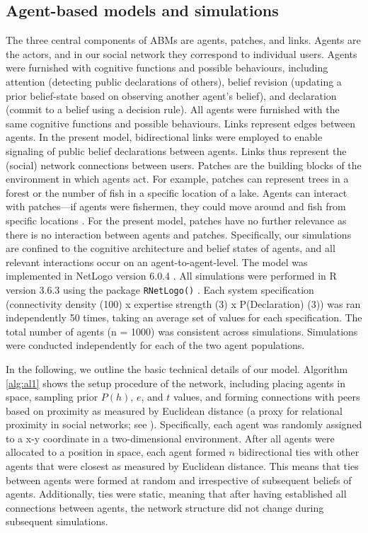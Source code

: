 \documentclass[fleqn,10pt]{wlscirep}
\begin{document}
\subsection*{Agent-based models and simulations}
The three central components of ABMs are agents, patches, and links. Agents are the actors, and in our social network they correspond to individual users. Agents were furnished with cognitive functions and possible behaviours, including attention (detecting public declarations of others), belief revision (updating a prior belief-state based on observing another agent’s belief), and declaration (commit to a belief using a decision rule). All agents were furnished with the same cognitive functions and possible behaviours. Links represent edges between agents. In the present model, bidirectional links were employed to enable signaling of public belief declarations between agents. Links thus represent the (social) network connections between users. Patches are the building blocks of the environment in which agents act. For example, patches can represent trees in a forest or the number of fish in a specific location of a lake. Agents can interact with patches---if agents were fishermen, they could move around and fish from specific locations \cite{bailey2018computational}. For the present model, patches have no further relevance as there is no interaction between agents and patches. Specifically, our simulations are confined to the cognitive architecture and belief states of agents, and all relevant interactions occur on an agent-to-agent-level.
The model was implemented in NetLogo version 6.0.4 \cite{wilensky1999netlogo}. All simulations were performed in R version 3.6.3 \cite{rversion} using the package {\tt RNetLogo()} \cite{thiele2014r}. Each system specification (connectivity density (100) x expertise strength (3) x P(Declaration) (3)) was ran independently 50 times, taking an average set of values for each specification. The total number of agents (n = 1000) was consistent across simulations. Simulations were conducted independently for each of the two agent populations.

In the following, we outline the basic technical details of our model. Algorithm \ref{alg:al1} shows the setup procedure of the network, including placing agents in space, sampling prior \(P(h)\), \(e\), and \(t\) values, and forming connections with peers based on proximity as measured by Euclidean distance (a proxy for relational proximity in social networks; see \cite{duggins2017}). Specifically, each agent was randomly assigned to a x-y coordinate in a two-dimensional environment. After all agents were allocated to a position in space, each agent formed \(n\) bidirectional ties with other agents that were closest as measured by Euclidean distance. This means that ties between agents were formed at random and irrespective of subsequent beliefs of agents. Additionally, ties were static, meaning that after having established all connections between agents, the network structure did not change during subsequent simulations.  
\end{document}
